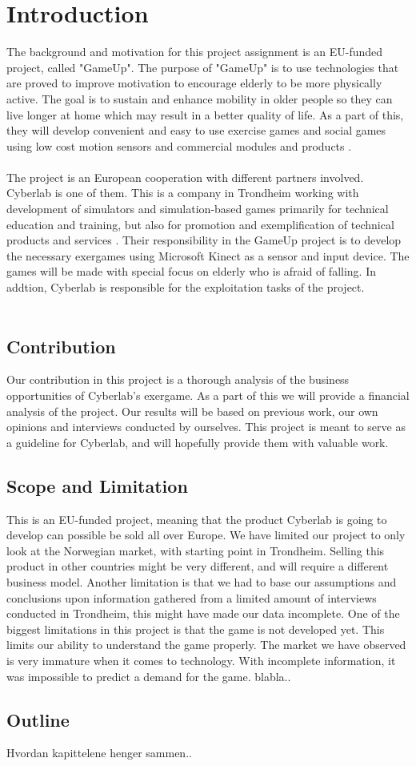 \chapter{Introduction}
The background and motivation for this project assignment is an EU-funded project, called "GameUp". The purpose of "GameUp" is to use technologies that are proved to improve motivation to encourage elderly to be more physically active. The goal is to sustain and enhance mobility in older people so they can live longer at home which may result in a better quality of life. As a part of this, they will develop convenient and easy to use exercise games and social games using low cost motion sensors and commercial modules and products \cite{gameup}.\\ \\ The project is an European cooperation with different partners involved. Cyberlab is one of them. This is a company in Trondheim working with development of simulators and simulation-based games primarily for technical education and training, but also for promotion and exemplification of technical products and services \cite{cyberlab}. Their responsibility in the GameUp project is to develop the necessary exergames using Microsoft Kinect as a sensor and input device. The games will be made with special focus on elderly who is afraid of falling. In addtion, Cyberlab is responsible for the exploitation tasks of the project.  \\ \\

\section{Contribution}
Our contribution in this project is a thorough analysis of the business opportunities of Cyberlab’s exergame. As a part of this we will provide a financial analysis of the project. Our results will be based on previous work, our own opinions and interviews conducted by ourselves. This project is meant to serve as a guideline for Cyberlab, and will hopefully provide them with valuable work.  

\section{Scope and Limitation}
This is an EU-funded project, meaning that the product Cyberlab is going to develop can possible be sold all over Europe. We have limited our project to only look at the Norwegian market, with starting point in Trondheim. Selling this product in other countries might be very different, and will require a different business model. Another limitation is that we had to base our assumptions and conclusions upon information gathered from a limited amount of interviews conducted in Trondheim, this might have made our data incomplete.  One of the biggest limitations in this project is that the game is not developed yet. This limits our ability to understand the game properly. The market we have observed is very immature when it comes to technology. With incomplete information, it was impossible to predict a demand for the game. blabla..

\section{Outline}
Hvordan kapittelene henger sammen..
